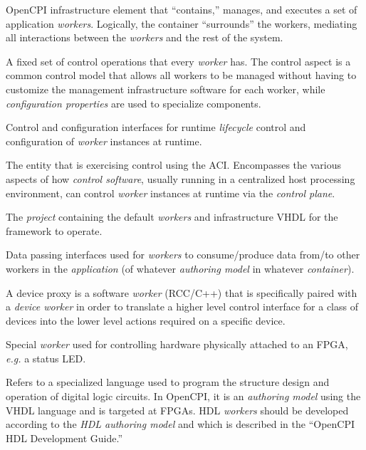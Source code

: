 \begin{description}[style=nextline]
\item[Containers]
OpenCPI infrastructure element that ``contains,'' manages, and executes a set of application \textit{workers}. Logically, the container ``surrounds'' the workers, mediating all interactions between the \textit{workers} and the rest of the system.

\item[Control Operations]
A fixed set of control operations that every \textit{worker} has. The control aspect is a common control model that allows all workers to be managed without having to customize the management infrastructure software for each worker, while \textit{configuration properties} are used to specialize components.

\item[Control Plane]
Control and configuration interfaces for runtime \textit{lifecycle} control and configuration of \textit{worker} instances at runtime.

\item[Control Software (AKA Control Application AKA Control Agent)]
The entity that is exercising control using the ACI. Encompasses the various aspects of how \textit{control software}, usually running in a centralized host processing environment, can control \textit{worker} instances at runtime via the \textit{control plane}.

\item[Core]
The \textit{project} containing the default \textit{workers} and infrastructure VHDL for the framework to operate.

\item[Data Plane]
Data passing interfaces used for \textit{workers} to consume/produce data from/to other workers in the \textit{application} (of whatever \textit{authoring model} in whatever \textit{container}).

\item[Device Proxy]
A device proxy is a software \textit{worker} (RCC/C++) that is specifically paired with a \textit{device worker} in order to translate a higher level control interface for a class of devices into the lower level actions required on a specific device.

\item[Device Worker]
Special \textit{worker} used for controlling hardware physically attached to an FPGA, \textit{e.g.} a status LED.

\item[Hardware Description Language]
Refers to a specialized language used to program the structure design and operation of digital logic circuits. In OpenCPI, it is an \textit{authoring model} using the VHDL language and is targeted at FPGAs. HDL \textit{workers} should be developed according to the \textit{HDL authoring model} and which is described in the ``OpenCPI HDL Development Guide.''


\end{description}
